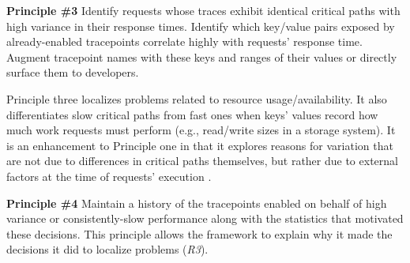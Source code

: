 



\noindent\textbf{Principle \#3} Identify requests whose traces exhibit
identical critical paths with high variance in their
response times.  Identify which key/value pairs exposed by
already-enabled tracepoints correlate highly with requests' response
time.  Augment tracepoint names with these keys and ranges of their
values or directly surface them to developers.

Principle three localizes problems related to resource
usage/availability.  It also differentiates slow critical paths from
fast ones when keys' values record how much work requests must perform
(e.g., read/write sizes in a storage system).  It is an enhancement to
Principle one in that it explores reasons for variation that are not
due to differences in critical paths themselves, but rather due to
external factors at the time of requests' execution .



\noindent\textbf{Principle \#4} Maintain a history of the tracepoints
enabled on behalf of high variance or consistently-slow performance
along with the statistics that motivated these decisions.  This
principle allows the framework to explain why it made the decisions it
did to localize problems (\textit{R3}).


